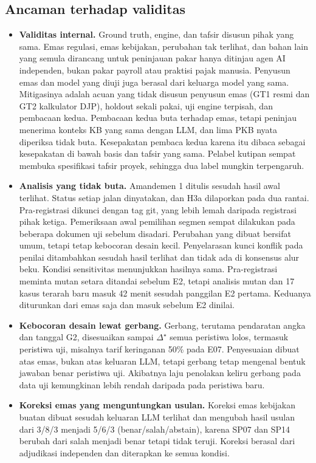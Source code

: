 \documentclass[conference]{IEEEtran}
\makeatletter
\DeclareRobustCommand{\en}[1]{{\usefont{\f@encoding}{\f@family}{\f@series}{it}#1\/}}
\newcommand{\emas}{\star}
\makeatother
\begin{document}
\subsection{Ancaman terhadap validitas}
\label{subsec:ancaman}
\begin{itemize}[leftmargin=*,nosep]
  \item \textbf{Validitas internal.} \en{Ground truth}, \en{engine}, dan tafsir disusun pihak yang sama. Emas regulasi, emas kebijakan, perubahan tak terlihat, dan bahan lain yang semula dirancang untuk peninjauan pakar hanya ditinjau agen AI independen, bukan pakar \en{payroll} atau praktisi pajak manusia. Penyusun emas dan model yang diuji juga berasal dari keluarga model yang sama. Mitigasinya adalah acuan yang tidak disusun penyusun emas (GT1 resmi dan GT2 kalkulator DJP), \en{holdout} sekali pakai, uji \en{engine} terpisah, dan pembacaan kedua. Pembacaan kedua buta terhadap emas, tetapi peninjau menerima konteks KB yang sama dengan LLM, dan lima PKB nyata diperiksa tidak buta. Kesepakatan pembaca kedua karena itu dibaca sebagai kesepakatan di bawah basis dan tafsir yang sama. Pelabel kutipan sempat membuka spesifikasi tafsir proyek, sehingga dua label mungkin terpengaruh.
  \item \textbf{Analisis yang tidak buta.} Amandemen 1 ditulis sesudah hasil awal terlihat. Status setiap jalan dinyatakan, dan H3a dilaporkan pada dua rantai. Pra-registrasi dikunci dengan \en{tag} git, yang lebih lemah daripada registrasi pihak ketiga. Pemeriksaan awal pemilihan segmen sempat dilakukan pada beberapa dokumen uji sebelum disadari. Perubahan yang dibuat bersifat umum, tetapi tetap kebocoran desain kecil. Penyelarasan kunci konflik pada penilai ditambahkan sesudah hasil terlihat dan tidak ada di konsensus alur beku. Kondisi sensitivitas menunjukkan hasilnya sama. Pra-registrasi meminta mutan setara ditandai sebelum E2, tetapi analisis mutan dan 17 kasus terarah baru masuk 42 menit sesudah panggilan E2 pertama. Keduanya diturunkan dari emas saja dan masuk sebelum E2 dinilai.
  \item \textbf{Kebocoran desain lewat gerbang.} Gerbang, terutama pendaratan angka dan tanggal G2, disesuaikan sampai $\Delta^{\emas}$ semua peristiwa lolos, termasuk peristiwa uji, misalnya tarif keringanan 50\% pada E07. Penyesuaian dibuat atas emas, bukan atas keluaran LLM, tetapi gerbang tetap mengenal bentuk jawaban benar peristiwa uji. Akibatnya laju penolakan keliru gerbang pada data uji kemungkinan lebih rendah daripada pada peristiwa baru.
  \item \textbf{Koreksi emas yang menguntungkan usulan.} Koreksi emas kebijakan buatan dibuat sesudah keluaran LLM terlihat dan mengubah hasil usulan dari 3/8/3 menjadi 5/6/3 (benar/salah/\en{abstain}), karena SP07 dan SP14 berubah dari salah menjadi benar tetapi tidak teruji. Koreksi berasal dari adjudikasi independen dan diterapkan ke semua kondisi.

\end{itemize}
\end{document}
